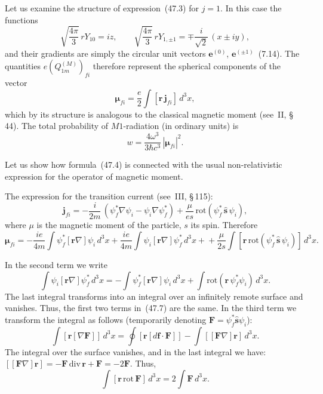 Let us examine the structure of expression~(47.3) for $j = 1$. In this case the functions
\[
\sqrt{\frac{4\pi}{3}}\,rY_{10} = iz,\qquad \sqrt{\frac{4\pi}{3}}\,rY_{1,\pm 1} = \mp\frac{i}{\sqrt{2}}\,(x\pm iy),
\]
and their gradients are simply the circular unit vectors $\mathbf{e}^{(0)}$, $\mathbf{e}^{(\pm 1)}$~(7.14). The quantities $e(Q^{(M)}_{1m})_{fi}$ therefore represent the spherical components of the vector
\begin{equation}
\boldsymbol{\mu}_{fi} = \frac{e}{2}\int[\mathbf{r}\,\mathbf{j}_{fi}]\,d^3x,
\tag{47.4}
\end{equation}
which by its structure is analogous to the classical magnetic moment (see~II, \S\,44). The total probability of $M1$-radiation (in ordinary units) is
\begin{equation}
w = \frac{4\omega^3}{3\hbar c^3}\,|\boldsymbol{\mu}_{fi}|^2.
\tag{47.5}
\end{equation}

Let us show how formula~(47.4) is connected with the usual non-relativistic expression for the operator of magnetic moment.

The expression for the transition current (see~III, \S\,115):
\begin{equation}
\mathbf{j}_{fi} = -\frac{i}{2m}\,(\psi^*_f\nabla\psi_i - \psi_i\nabla\psi^*_f) + \frac{\mu}{es}\,\mathrm{rot}(\psi^*_f\,\widehat{\mathbf{s}}\,\psi_i),
\tag{47.6}
\end{equation}
where $\mu$ is the magnetic moment of the particle, $s$ its spin. Therefore
\begin{equation}
\boldsymbol{\mu}_{fi} = -\frac{ie}{4m}\int\psi^*_f[\mathbf{r}\nabla]\psi_i\,d^3x + \frac{ie}{4m}\int\psi_i[\mathbf{r}\nabla]\psi^*_f\,d^3x +
{} + \frac{\mu}{2s}\int[\mathbf{r}\,\mathrm{rot}(\psi^*_f\,\widehat{\mathbf{s}}\,\psi_i)]\,d^3x.
\tag{47.7}
\end{equation}

In the second term we write
\[
\int\psi_i[\mathbf{r}\nabla]\psi^*_f\,d^3x = -\int\psi^*_f[\mathbf{r}\nabla]\psi_i\,d^3x + \int\mathrm{rot}(\mathbf{r}\,\psi^*_f\psi_i)\,d^3x.
\]
The last integral transforms into an integral over an infinitely remote surface and vanishes. Thus, the first two terms in~(47.7) are the same. In the third term we transform the integral as follows (temporarily denoting $\mathbf{F} = \psi^*_f\widehat{\mathbf{s}}\psi_i$):
\[
\int[\mathbf{r}[\nabla\mathbf{F}]]\,d^3x = \oint[\mathbf{r}[d\mathbf{f}\cdot\mathbf{F}]] - \int[[\mathbf{F}\nabla]\mathbf{r}]\,d^3x.
\]
The integral over the surface vanishes, and in the last integral we have: $[[\mathbf{F}\nabla]\mathbf{r}] = -\mathbf{F}\,\mathrm{div}\,\mathbf{r} + \mathbf{F} = -2\mathbf{F}$. Thus,
\[
\int[\mathbf{r}\,\mathrm{rot}\,\mathbf{F}]\,d^3x = 2\int\mathbf{F}\,d^3x.
\]

